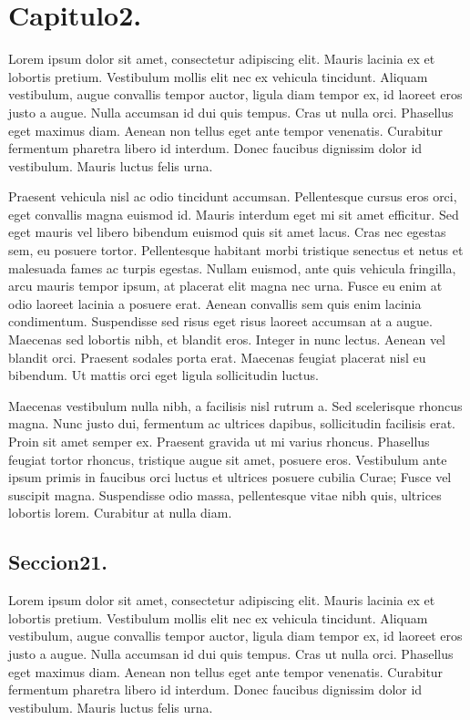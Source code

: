 \chapter{Capitulo2.}\label{cap:capitulo2}

Lorem ipsum dolor sit amet, consectetur adipiscing elit. Mauris lacinia ex et lobortis pretium. Vestibulum mollis elit nec ex vehicula tincidunt. Aliquam vestibulum, augue convallis tempor auctor, ligula diam tempor ex, id laoreet eros justo a augue. Nulla accumsan id dui quis tempus. Cras ut nulla orci. Phasellus eget maximus diam. Aenean non tellus eget ante tempor venenatis. Curabitur fermentum pharetra libero id interdum. Donec faucibus dignissim dolor id vestibulum. Mauris luctus felis urna.

Praesent vehicula nisl ac odio tincidunt accumsan. Pellentesque cursus eros orci, eget convallis magna euismod id. Mauris interdum eget mi sit amet efficitur. Sed eget mauris vel libero bibendum euismod quis sit amet lacus. Cras nec egestas sem, eu posuere tortor. Pellentesque habitant morbi tristique senectus et netus et malesuada fames ac turpis egestas. Nullam euismod, ante quis vehicula fringilla, arcu mauris tempor ipsum, at placerat elit magna nec urna. Fusce eu enim at odio laoreet lacinia a posuere erat. Aenean convallis sem quis enim lacinia condimentum. Suspendisse sed risus eget risus laoreet accumsan at a augue. Maecenas sed lobortis nibh, et blandit eros. Integer in nunc lectus. Aenean vel blandit orci. Praesent sodales porta erat. Maecenas feugiat placerat nisl eu bibendum. Ut mattis orci eget ligula sollicitudin luctus.

Maecenas vestibulum nulla nibh, a facilisis nisl rutrum a. Sed scelerisque rhoncus magna. Nunc justo dui, fermentum ac ultrices dapibus, sollicitudin facilisis erat. Proin sit amet semper ex. Praesent gravida ut mi varius rhoncus. Phasellus feugiat tortor rhoncus, tristique augue sit amet, posuere eros. Vestibulum ante ipsum primis in faucibus orci luctus et ultrices posuere cubilia Curae; Fusce vel suscipit magna. Suspendisse odio massa, pellentesque vitae nibh quis, ultrices lobortis lorem. Curabitur at nulla diam. 



\section{Seccion21.}

Lorem ipsum dolor sit amet, consectetur adipiscing elit. Mauris lacinia ex et lobortis pretium. Vestibulum mollis elit nec ex vehicula tincidunt. Aliquam vestibulum, augue convallis tempor auctor, ligula diam tempor ex, id laoreet eros justo a augue. Nulla accumsan id dui quis tempus. Cras ut nulla orci. Phasellus eget maximus diam. Aenean non tellus eget ante tempor venenatis. Curabitur fermentum pharetra libero id interdum. Donec faucibus dignissim dolor id vestibulum. Mauris luctus felis urna.

